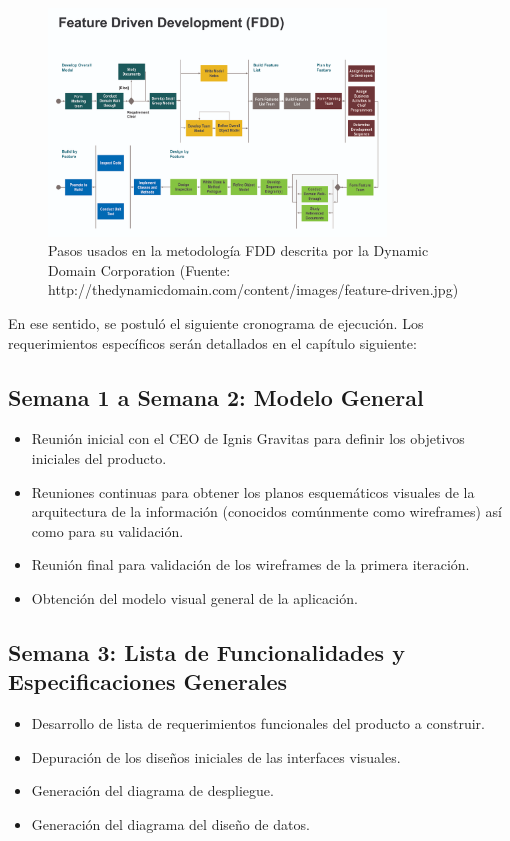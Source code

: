 \begin{figure}[H]
\centering
\includegraphics[width=0.80\textwidth]{img/6.png}
\caption{Pasos usados en la metodología FDD descrita por la Dynamic Domain Corporation (Fuente: http://thedynamicdomain.com/content/images/feature-driven.jpg)}
\label{figure:FDDsteps}
\end{figure}

En ese sentido, se postuló el siguiente cronograma de ejecución. Los requerimientos específicos serán detallados en el capítulo siguiente:

\subsection{Semana 1 a Semana 2: Modelo General}

\begin{itemize}
    \item Reunión inicial con el CEO de Ignis Gravitas para definir los objetivos iniciales del producto.
    \item Reuniones continuas para obtener los planos esquemáticos visuales de la arquitectura de la información (conocidos comúnmente como wireframes) así como para su validación.
    \item Reunión final para validación de los wireframes de la primera iteración.
    \item Obtención del modelo visual general de la aplicación.
\end{itemize}

\subsection{Semana 3: Lista de Funcionalidades y Especificaciones Generales}
\begin{itemize}
    \item Desarrollo de lista de requerimientos funcionales del producto a construir.
    \item Depuración de los diseños iniciales de las interfaces visuales.
    \item Generación del diagrama de despliegue.
    \item Generación del diagrama del diseño de datos.
\end{itemize}

